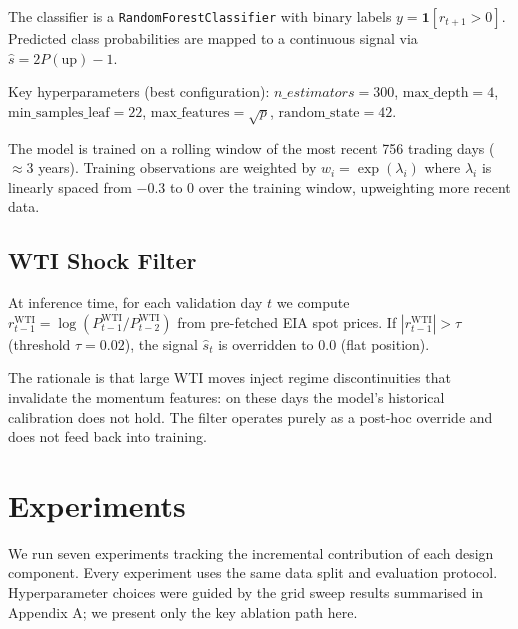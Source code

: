 \documentclass{article}
\begin{document}
The classifier is a \texttt{RandomForestClassifier} with binary labels $y = \mathbf{1}[r_{t+1} > 0]$.
Predicted class probabilities are mapped to a continuous signal via $\hat{s} = 2P(\text{up}) - 1$.

Key hyperparameters (best configuration):
$n\_estimators = 300$, $\text{max\_depth} = 4$, $\text{min\_samples\_leaf} = 22$,
$\text{max\_features} = \sqrt{p}$, $\text{random\_state} = 42$.

The model is trained on a rolling window of the most recent 756 trading days
($\approx 3$ years). Training observations are weighted by
$w_i = \exp(\lambda_i)$ where $\lambda_i$ is linearly spaced from $-0.3$ to $0$
over the training window, upweighting more recent data.

\subsection{WTI Shock Filter}

At inference time, for each validation day $t$ we compute
$r^{\text{WTI}}_{t-1} = \log(P^{\text{WTI}}_{t-1} / P^{\text{WTI}}_{t-2})$
from pre-fetched EIA spot prices. If $|r^{\text{WTI}}_{t-1}| > \tau$
(threshold $\tau = 0.02$), the signal $\hat{s}_t$ is overridden to 0.0 (flat position).

The rationale is that large WTI moves inject regime discontinuities that invalidate
the momentum features: on these days the model's historical calibration does not hold.
The filter operates purely as a post-hoc override and does not feed back into training.

\section{Experiments}

We run seven experiments tracking the incremental contribution of each design
component. Every experiment uses the same data split and evaluation protocol.
Hyperparameter choices were guided by the grid sweep results summarised in
Appendix A; we present only the key ablation path here.
\end{document}
